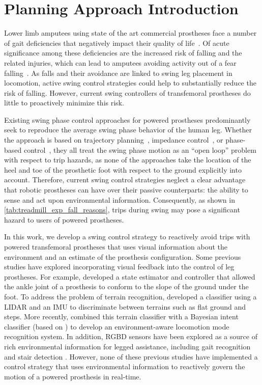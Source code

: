 \section{Planning Approach Introduction}\label{sec:swing_control_planning_intro}
Lower limb amputees using state of the art commercial prostheses face a number
of gait deficiencies that negatively impact their quality of
life~\citep{gauthier1999enabling}. Of acute significance among these
deficiencies are the increased risk of falling and the related injuries, which
can lead to amputees avoiding activity out of a fear
falling~\citep{miller2001prevalence}.  As falls and their avoidance are linked
to swing leg placement in locomotion, active swing control strategies could help
to substantially reduce the risk of falling. However, current swing controllers
of transfemoral prostheses do little to proactively minimize this risk. 

Existing swing phase control approaches for powered prostheses predominantly
seek to reproduce the average swing phase behavior of the human leg. Whether the
approach is based on trajectory planning~\citep{lenzi2014speed}, impedance
control~\citep{sup2009preliminary}, or phase-based
control~\citep{quintero2016preliminary}, they all treat the swing phase motion
as an ``open loop'' problem with respect to trip hazards, as none of the
approaches take the location of the heel and toe of the prosthetic foot with
respect to the ground explicitly into account.  Therefore, current swing control
strategies neglect a clear advantage that robotic prostheses can have over their
passive counterparts: the ability to sense and act upon environmental
information.  Consequently, as shown in \cref{tab:treadmill_exp_fall_reasons},
trips during swing may pose a significant hazard to users of powered prostheses.

In this work, we develop a swing control strategy to reactively avoid trips with
powered transfemoral prostheses that uses visual information about the
environment and an estimate of the prosthesis configuration. Some previous
studies have explored incorporating visual feedback into the control of leg
prostheses. For example, \citet{scandaroli2009estimation} developed a state
estimator and controller that allowed the ankle joint of a prosthesis to conform
to the slope of the ground under the foot. To address the problem of terrain
recognition, \citet{zhang2011preliminary} developed a classifier using a LIDAR
and an IMU to discriminate between terrains such as flat ground and steps. More
recently, \citet{liu2016development} combined this terrain classifier with a
Bayesian intent classifier (based on \citep{du2012toward}) to develop an
environment-aware locomotion mode recognition system. In addition, RGBD sensors
have been explored as a source of rich environmental information for legged
assistance, including gait recognition \citep{massalin2017user} and stair
detection \citep{krausz2015depth,duan2018real}. However, none of these previous
studies have implemented a control strategy that uses environmental
information to reactively govern the motion of a powered prosthesis in
real-time. 

